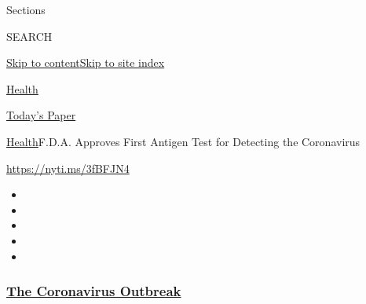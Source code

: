 Sections

SEARCH

\protect\hyperlink{site-content}{Skip to
content}\protect\hyperlink{site-index}{Skip to site index}

\href{https://www.nytimes3xbfgragh.onion/section/health}{Health}

\href{https://myaccount.nytimes3xbfgragh.onion/auth/login?response_type=cookie\&client_id=vi}{}

\href{https://www.nytimes3xbfgragh.onion/section/todayspaper}{Today's
Paper}

\href{/section/health}{Health}\textbar{}F.D.A. Approves First Antigen
Test for Detecting the Coronavirus

\url{https://nyti.ms/3fBFJN4}

\begin{itemize}
\item
\item
\item
\item
\item
\end{itemize}

\hypertarget{the-coronavirus-outbreak}{%
\subsubsection{\texorpdfstring{\href{https://www.nytimes3xbfgragh.onion/news-event/coronavirus?name=styln-coronavirus-national\&region=TOP_BANNER\&block=storyline_menu_recirc\&action=click\&pgtype=Article\&impression_id=7d7b0c30-f4b7-11ea-9a51-c71a1ff23523\&variant=undefined}{The
Coronavirus
Outbreak}}{The Coronavirus Outbreak}}\label{the-coronavirus-outbreak}}

